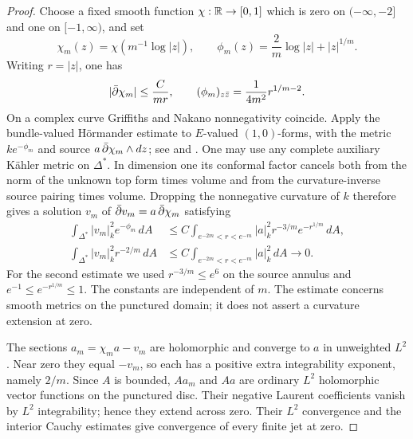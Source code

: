 \begin{proof}
Choose a fixed smooth function $\chi:\mathbb R\to[0,1]$ which is zero on
$(-\infty,-2]$ and one on $[-1,\infty)$, and set
\[
 \chi_m(z)=\chi(m^{-1}\log|z|),\qquad
 \phi_m(z)=\frac2m\log|z|+|z|^{1/m}.
\]
Writing $r=|z|$, one has
\[
 |\bar\partial\chi_m|\le\frac{C}{mr},\qquad
 (\phi_m)_{z\bar z}=\frac1{4m^2}r^{1/m-2}.
\]
On a complex curve Griffiths and Nakano nonnegativity coincide.  Apply
the bundle-valued H\"ormander estimate to $E$-valued $(1,0)$-forms,
with the metric $ke^{-\phi_m}$ and source
$a\,\bar\partial\chi_m\wedge dz$; see \cite{Hormander} and
\cite[Theorem 5.1 and Remark 4.5]{Demailly}.
One may use any complete auxiliary K\"ahler metric on $\Delta^*$.
In dimension one its conformal factor cancels both from the norm of
the unknown top form times volume and from the curvature-inverse
source pairing times volume.  Dropping the nonnegative curvature of
$k$ therefore gives a solution $v_m$ of
$\bar\partial v_m=a\,\bar\partial\chi_m$ satisfying
\begin{align}
 \int_{\Delta^*}|v_m|_k^2e^{-\phi_m}\,dA
 &\le C\int_{e^{-2m}<r<e^{-m}}
       |a|_k^2r^{-3/m}e^{-r^{1/m}}\,dA,\label{disc:weighted-solve}\\
 \int_{\Delta^*}|v_m|_k^2r^{-2/m}\,dA
 &\le C\int_{e^{-2m}<r<e^{-m}}|a|_k^2\,dA\longrightarrow0.
 \label{disc:correction-small}
\end{align}
For the second estimate we used $r^{-3/m}\le e^6$ on the source
annulus and $e^{-1}\le e^{-r^{1/m}}\le1$.  The constants are
independent of $m$.  The estimate concerns smooth metrics on the
punctured domain; it does not assert a curvature extension at zero.

The sections $a_m=\chi_ma-v_m$ are holomorphic and converge to $a$
in unweighted $L^2$.  Near zero they equal $-v_m$, so each has a
positive extra integrability exponent, namely $2/m$.  Since $A$ is
bounded, $Aa_m$ and $Aa$ are ordinary $L^2$ holomorphic vector
functions on the punctured disc.  Their negative Laurent coefficients
vanish by $L^2$ integrability; hence they extend across zero.
Their $L^2$ convergence and the interior Cauchy estimates give
convergence of every finite jet at zero.


\end{proof}
